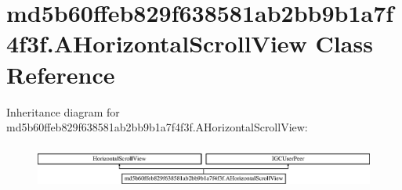 \hypertarget{classmd5b60ffeb829f638581ab2bb9b1a7f4f3f_1_1AHorizontalScrollView}{}\section{md5b60ffeb829f638581ab2bb9b1a7f4f3f.\+A\+Horizontal\+Scroll\+View Class Reference}
\label{classmd5b60ffeb829f638581ab2bb9b1a7f4f3f_1_1AHorizontalScrollView}
Inheritance diagram for md5b60ffeb829f638581ab2bb9b1a7f4f3f.\+A\+Horizontal\+Scroll\+View\+:\begin{figure}[H]
\begin{center}
\leavevmode
\includegraphics[height=1.473684cm]{classmd5b60ffeb829f638581ab2bb9b1a7f4f3f_1_1AHorizontalScrollView}
\end{center}
\end{figure}
